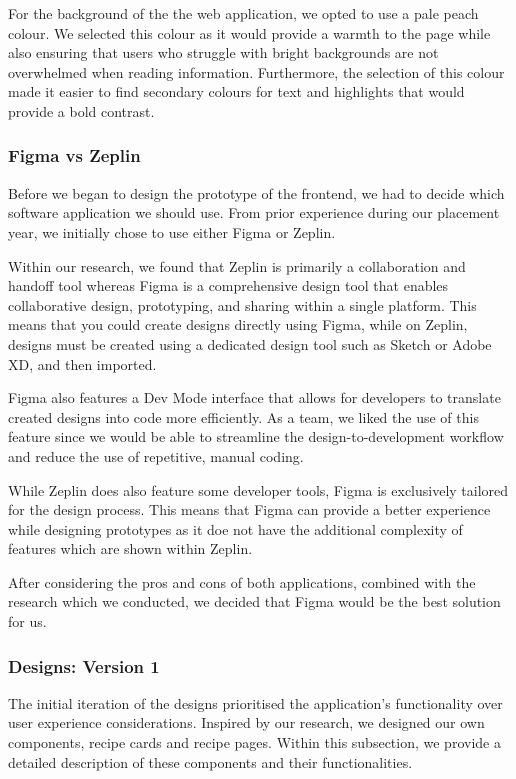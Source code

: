 \documentclass{article}
\begin{document}
For the background of the the web application, we opted to use a pale peach colour. We selected this colour as it would provide a warmth to the page while also ensuring that users who struggle with bright backgrounds are not overwhelmed when reading information. Furthermore, the selection of this colour made it easier to find secondary colours for text and highlights that would provide a bold contrast.

\subsubsection{Figma vs Zeplin}
Before we began to design the prototype of the frontend, we had to decide which software application we should use. From prior experience during our placement year, we initially chose to use either Figma or Zeplin.

Within our research, we found that Zeplin is primarily a collaboration and handoff tool whereas Figma is a comprehensive design tool that enables collaborative design, prototyping, and sharing within a single platform. This means that you could create designs directly using Figma, while on Zeplin, designs must be created using a dedicated design tool such as Sketch or Adobe XD, and then imported.

Figma also features a Dev Mode interface that allows for developers to translate created designs into code more efficiently. As a team, we liked the use of this feature since we would be able to streamline the design-to-development workflow and reduce the use of repetitive, manual coding.

While Zeplin does also feature some developer tools, Figma is exclusively tailored for the design process. This means that Figma can provide a better experience while designing prototypes as it doe not have the additional complexity of features which are shown within Zeplin.

After considering the pros and cons of both applications, combined with the research which we conducted, we decided that Figma would be the best solution for us.

\subsubsection{Designs: Version 1}
The initial iteration of the designs prioritised the application's functionality over user experience considerations. Inspired by our research, we designed our own components, recipe cards and recipe pages. Within this subsection, we provide a detailed description of these components and their functionalities.
\end{document}
